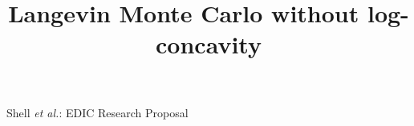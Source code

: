 \documentclass[10pt,journal,a4paper]{IEEEtran}
\theoremstyle{definition}
\begin{document}
%
\title{Langevin Monte Carlo without log-concavity}
%
%
%
%
% 
%



%
{Shell \MakeLowercase{\textit{et al.}}: EDIC Research Proposal}
% 
\end{document}
